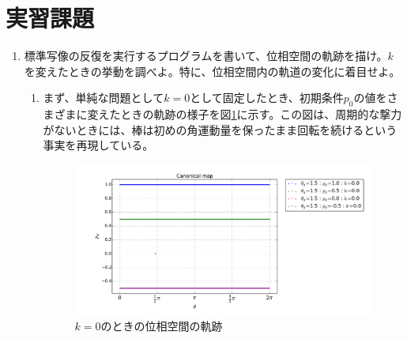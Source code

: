 \documentclass{jsarticle}
\begin{document}
            
    \section{実習課題}
    
        \begin{enumerate}
            \renewcommand{\labelenumi}{\alph{enumi}.}
            \renewcommand{\labelenumii}{}
            
            \item 標準写像の反復を実行するプログラムを書いて、位相空間の軌跡を描け。$k$を変えたときの挙動を調べよ。特に、位相空間内の軌道の変化に着目せよ。
                \begin{enumerate}
                    \item まず、単純な問題として$k=0$として固定したとき、初期条件$p_{0}$の値をさまざまに変えたときの軌跡の様子を図\ref{fig:f2}に示す。この図は、周期的な撃力がないときには、棒は初めの角運動量を保ったまま回転を続けるという事実を再現している。
                    \begin{figure}[H]
                        \begin{center}
                            \includegraphics[width=16.5cm]{figure_2.pdf}
                            \caption{$k=0$のときの位相空間の軌跡}
                            \label{fig:f2}
                        \end{center}
                    \end{figure}
                        

\end{enumerate}
\end{enumerate}
\end{document}
